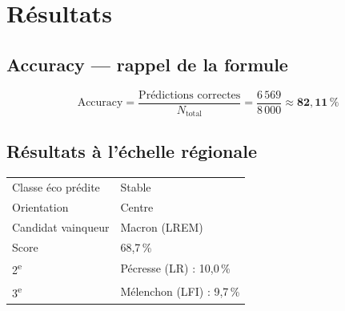 \documentclass[12pt,a4paper,oneside]{report}
\newcommand{\pct}[1]{#1\,\%}
\begin{document}
\chapter{Résultats}
\label{chap:resultats}

\section{Accuracy — rappel de la formule}

\begin{equation}
  \text{Accuracy} = \frac{\text{Prédictions correctes}}{N_{\text{total}}}
  = \frac{6\,569}{8\,000} \approx \mathbf{82{,}11\,\%}
  \label{eq:accuracy}
\end{equation}

\section{Résultats à l'échelle régionale}

\begin{resultbox}
\begin{tabular}{ll}
Classe éco prédite  & Stable \\
Orientation         & Centre \\
Candidat vainqueur  & Macron (LREM) \\
Score               & \pct{68,7} \\
2\textsuperscript{e} & Pécresse (LR) : \pct{10,0} \\
3\textsuperscript{e} & Mélenchon (LFI) : \pct{9,7} \\
\end{tabular}
\end{resultbox}
\end{document}
